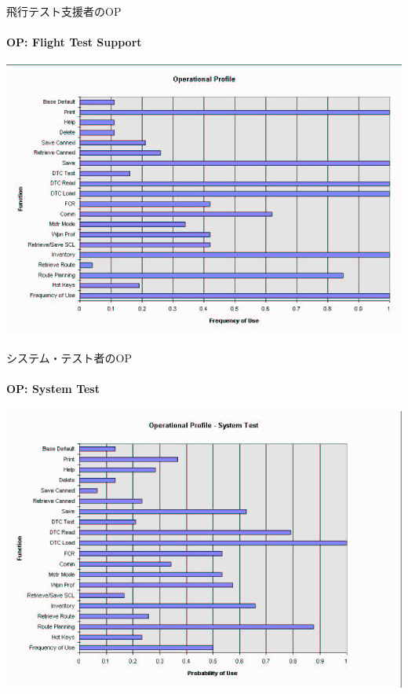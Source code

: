 \begin{frame}{飛行テスト支援者のOP}
\framesubtitle{OP: Flight Test Support}
\begin{center}
\includegraphics[width=\textwidth,height=0.7\textheight,keepaspectratio]{figure/OPfts.png}
\end{center}
\end{frame}
\begin{frame}{システム・テスト者のOP}
\framesubtitle{OP: System Test}
\begin{center}
\includegraphics[width=\textwidth,height=0.7\textheight,keepaspectratio]{figure/OPst.png}
\end{center}
\end{frame}

